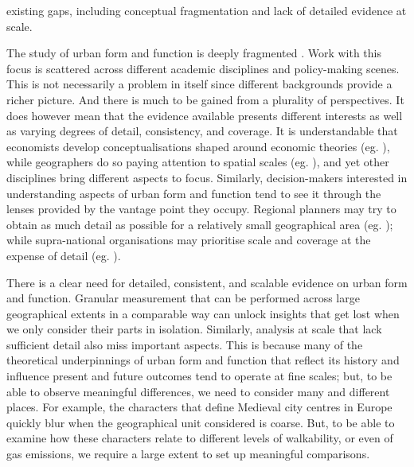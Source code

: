 existing gaps, including conceptual fragmentation and lack of detailed
evidence at scale.

The study of urban form and function is deeply fragmented
\citep{kropf2014ambiguity,brenner2015towards,gauthier2006mapping}.
Work with this focus is scattered across
different academic disciplines and policy-making scenes. This is not
necessarily a problem in itself since different backgrounds
provide a richer picture. And there is much to be gained from a plurality of
perspectives.
%
It does however mean that the evidence available presents different
interests as well as varying degrees of detail, consistency, and coverage.
It is understandable that economists develop conceptualisations shaped around
economic theories (eg. \citealp{ahlfeldt2019}), while geographers do so paying attention
to spatial scales (eg. \citealp{boeing2018}),
and yet other disciplines bring different aspects to focus.
Similarly, decision-makers interested in understanding aspects of urban form
and function tend to see it through the lenses provided by the vantage point
they occupy. Regional planners may try to obtain as much detail as
possible for a relatively small geographical area (eg. \citealp{bcnnight});
while supra-national organisations may prioritise scale and coverage
at the expense of detail (eg. \citealp{eea2016}).

There is a clear need for detailed, consistent, and scalable evidence on urban
form and function.
Granular measurement that can be performed across large
geographical extents in a comparable way can unlock insights that get lost
when we only consider their parts in isolation. Similarly, analysis at scale
that lack sufficient detail also miss important aspects.
%
This is because many of the
theoretical underpinnings of urban form and function that reflect its history
and influence present and future outcomes tend to operate at fine scales; but,
to be able to observe meaningful differences, we need to consider many and
different places.
%
For example, the characters that define Medieval city centres in Europe
quickly blur when the geographical unit considered is coarse. But, to be able to
examine how these characters relate to different levels of walkability, or
even of gas emissions, we require a large extent to set up meaningful
comparisons.

